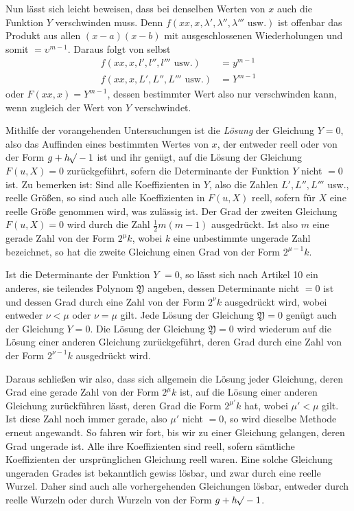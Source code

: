 Nun lässt sich leicht beweisen, dass bei denselben Werten von $x$ auch die Funktion $Y$ verschwinden muss. Denn $f(xx,x,\lambda',\lambda'',\lambda'''\text{ usw.})$ ist offenbar das Produkt aus allen $(x-a)(x-b)$ mit ausgeschlossenen Wiederholungen und somit $=\upsilon^{m-1}$. Daraus folgt von selbst
\[
\begin{aligned}
f(xx,x,l',l'',l'''\text{ usw.})&=y^{m-1}\\
f(xx,x,L',L'',L'''\text{ usw.})&=Y^{m-1}
\end{aligned}
\]
oder $F(xx,x)=Y^{m-1}$, dessen bestimmter Wert also nur verschwinden kann, wenn zugleich der Wert von $Y$ verschwindet.

Mithilfe der vorangehenden Untersuchungen ist die \textit{Lösung} der Gleichung $Y=0$, also das Auffinden eines bestimmten Wertes von $x$, der entweder reell oder von der Form $g+h\mathord{{}^{}\!\surd}-1$ ist und ihr genügt, auf die Lösung der Gleichung $F(u,X)=0$ zurückgeführt,
sofern die Determinante der Funktion $Y$ nicht $=0$ ist. Zu bemerken ist: Sind alle Koeffizienten in $Y$, also die Zahlen $L',L'',L'''$ usw., reelle Größen, so sind auch alle Koeffizienten in $F(u,X)$ reell, sofern für $X$ eine reelle Größe genommen wird, was zulässig ist. Der Grad der zweiten Gleichung $F(u,X)=0$ wird durch die Zahl $\frac12m(m-1)$ ausgedrückt. Ist also $m$ eine gerade Zahl von der Form $2^\mu k$, wobei $k$ eine unbestimmte ungerade Zahl bezeichnet, so hat die zweite Gleichung einen Grad von der Form $2^{\mu-1}k$.

Ist die Determinante der Funktion $Y$ $=0$, so lässt sich nach Artikel 10 ein anderes, sie teilendes Polynom $\mathfrak{Y}$ angeben, dessen Determinante nicht $=0$ ist und dessen Grad durch eine Zahl von der Form $2^\nu k$ ausgedrückt wird, wobei entweder $\nu<\mu$ oder $\nu=\mu$ gilt. Jede Lösung der Gleichung $\mathfrak{Y}=0$ genügt auch der Gleichung $Y=0$. Die Lösung der Gleichung $\mathfrak{Y}=0$ wird wiederum auf die Lösung einer anderen Gleichung zurückgeführt, deren Grad durch eine Zahl von der Form $2^{\nu-1}k$ ausgedrückt wird.

Daraus schließen wir also, dass sich allgemein die Lösung jeder Gleichung, deren Grad eine gerade Zahl von der Form $2^\mu k$ ist, auf die Lösung einer anderen Gleichung zurückführen lässt, deren Grad die Form $2^{\mu'}k$ hat, wobei $\mu'<\mu$ gilt. Ist diese Zahl noch immer gerade, also $\mu'$ nicht $=0$, so wird dieselbe Methode erneut angewandt. So fahren wir fort, bis wir zu einer Gleichung gelangen, deren Grad ungerade ist. Alle ihre Koeffizienten sind reell, sofern sämtliche Koeffizienten der ursprünglichen Gleichung reell waren. Eine solche Gleichung ungeraden Grades ist bekanntlich gewiss lösbar, und zwar durch eine reelle Wurzel. Daher sind auch alle vorhergehenden Gleichungen lösbar, entweder durch reelle Wurzeln oder durch Wurzeln von der Form $g+h\mathord{{}^{}\!\surd}-1$.

